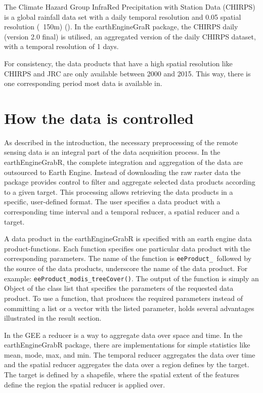 The Climate Hazard Group InfraRed Precipitation with Station Data (CHIRPS) is a global rainfall data set with a daily temporal resolution and 0.05 spatial resolution (~150m) (\cite{funk2015climate}). In the earthEngineGraR package, the CHIRPS daily (version 2.0 final) is utilised, an aggregated version of the daily CHIRPS dataset, with a temporal resolution of 1 days.

For consistency, the data products that have a high spatial resolution like CHIRPS and JRC are only available between 2000 and 2015. This way, there is one corresponding period most data is available in.

\section{How the data is controlled}

As described in the introduction, the necessary preprocessing of the remote sensing data is an integral part of the data acquisition process. In the earthEngineGrabR, the complete integration and aggregation of the data are outsourced to Earth Engine.
Instead of downloading the raw raster data the package provides control to filter and aggregate selected data products according to a given target. This processing allows retrieving the data products in a specific, user-defined format. The user specifies a data product with a corresponding time interval and a temporal reducer, a spatial reducer and a target. 

A data product in the earthEngineGrabR is specified with an earth engine data product-functions. Each function specifies one particular data product with the corresponding parameters. The name of the function is \texttt{eeProduct\_ }followed by the source of the data products, underscore the name of the data product. For example: \texttt{eeProduct\_modis\_treeCover()}. The output of the function is simply an Object of the class list that specifies the parameters of the requested data product. To use a function, that produces the required parameters instead of committing a list or a vector with the listed parameter, holds several advantages illustrated in the result section.

In the GEE a reducer is a way to aggregate data over space and time. In the earthEngineGrabR package, there are implementations for simple statistics like mean, mode, max, and min. The temporal reducer aggregates the data over time and the spatial reducer aggregates the data over a region defines by the target. 
The target is defined by a shapefile, where the spatial extent of the features define the region the spatial reducer is applied over.

